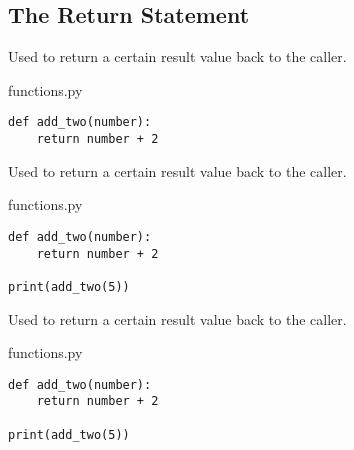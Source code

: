 \documentclass[aspectratio=1610,slidestop]{beamer}
\begin{document}
\subsection{The Return Statement}

\begin{pframe}
 Used to return a certain result value back to the caller.
 \begin{pythonfile}{functions.py}
  \begin{verbatim}
def add_two(number):
    return number + 2
  \end{verbatim}
 \end{pythonfile}
\end{pframe}


\begin{pframe}
 Used to return a certain result value back to the caller.
 \begin{pythonfile}{functions.py}
  \begin{verbatim}
def add_two(number):
    return number + 2

print(add_two(5))
  \end{verbatim}
 \end{pythonfile}
\end{pframe}


\begin{pframe}
 Used to return a certain result value back to the caller.
 \medskip

 \begin{minipage}[t]{0.47\textwidth}
  \begin{pythonfile}{functions.py}
   \begin{verbatim}
def add_two(number):
    return number + 2

print(add_two(5))
   \end{verbatim}
  \end{pythonfile}
 \end{minipage}\qquad
 \begin{minipage}[t]{0.47\textwidth}
 \vspace{-2.55cm}
 \begin{terminal}
 \end{terminal}
 \end{minipage}
\end{pframe}
\end{document}
